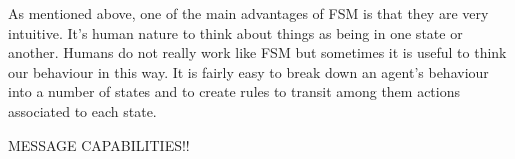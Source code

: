 As mentioned above, one of the main advantages of FSM is that they are very intuitive. It's human nature to think about things as being in one state or another. Humans do not really work like FSM but sometimes it is useful to think our behaviour in this way. It is fairly easy to break down an agent's behaviour into a number of states and to create rules to transit among them actions associated to each state.

MESSAGE CAPABILITIES!!

\ifx\isEmbedded\undefined


\pagebreak

\fi